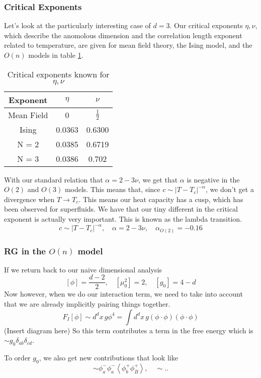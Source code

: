 \subsubsection{Critical Exponents} 
Let's look at the particularly interesting 
case of $ d = 3 $. Our critical exponents $ \eta , \nu$, 
which describe the anomolous dimension and the correlation 
length exponent related to temperature, are given for mean field theory, 
the Ising model, and the $ O ( n ) $ models in table \ref{tab:critExp}. 
\begin{table}[htpb]
\centering
\caption{Critical exponents known for $\eta , \nu  $}
\label{tab:critExp}
\begin{tabular}{c |  c c }
	Exponent & $ \eta  $  & $ \nu $ \\
	\hline 
	Mean Field & 0 & $ \frac{1}{2 }$ \\
	Ising & 0.0363 & 0.6300 \\
	N = 2 &  0.0385 & 0.6719  \\ 
	N  = 3 & 0.0386 & 0.702 \\
\end{tabular}
\end{table}

With our standard relation that $ \alpha = 2 - 3 \nu $, 
we get that $ \alpha $ is negative in the 
$ O ( 2)  $ and $ O ( 3)  $ models. This means that, 
since $ c \sim | T  - T _ c | ^{  - \alpha } $, 
we don't get a divergence when $ T \to T _ c $. 
This means our heat capacity has a cusp, 
which has been observed for superfluids. 
We have that our tiny different in the critical exponent is actually very important. 
This is known as the lambda transition. 
\[
c \sim | T - T _ c |^{ - \alpha } , \quad \alpha   = 2 - 3 \nu , \quad \alpha _{ O ( 2) } = - 0.16 
\] 
\subsubsection{RG in the $ O ( n ) $ model} 
If we return back to our naive dimensional analysis 
\[
[ \phi ] = \frac{ d - 2 }{ 2 }, \quad [ \mu _ 0 ^ 2 ] = 2 , \quad [ g _ 0 ] = 4 - d 
\] Now however, when 
we do our interaction term, we need to take into 
account that we are already implicitly pairing things 
together. 
\[
F _ I [ \phi ] \sim d ^ d x \, g \phi ^ 4  = \int d ^ d x \, g ( \phi \cdot  \phi ) ( \phi \cdot  \phi ) 
\] (Insert diagram here) 
So this term contributes a term in the free energy which is $ \sim g_ 0 \delta _{ ab } \delta _{ cd } $. 

To order $ g _ 0 $, we also get new contributions that look like 
\[
\sim \phi _ a ^ - \phi _ a ^ - \left< \phi_ b ^ + \phi _ B ^ +   \right>, \quad 
\sim ..
\] 
